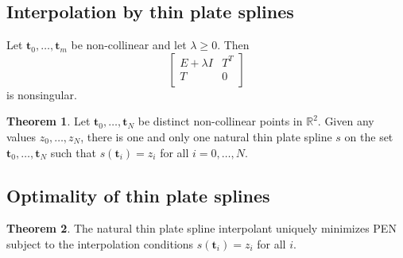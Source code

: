 \documentclass[12pt, openany]{report}
\newcommand{\R}{\mathbb{R}}
\theoremstyle{definition}
\newtheorem{thm}{Theorem}[chapter]
\begin{document}
\subsection{Interpolation by thin plate splines}
Let $\textbf{t}_0,\dots,\textbf{t}_m$ be non-collinear and let $\lambda \ge 0$. Then 
\begin{equation}
    \begin{bmatrix}
        E+\lambda I& T^T\\
        T & 0\\
    \end{bmatrix}
\end{equation}
is nonsingular. 
\begin{thm}
    Let $\textbf{t}_0,\dots,\textbf{t}_N$ be distinct non-collinear points in $\R^2$. Given any values $z_0,\dots, z_N$, there is one and only one natural thin plate spline $s$ on the set $\textbf{t}_0,\dots,\textbf{t}_N$ such that $s(\textbf{t}_i)=z_i$ for all $i=0,\dots,N$.
\end{thm}
\subsection{Optimality of thin plate splines}
\begin{thm}
    The natural thin plate spline interpolant uniquely minimizes PEN subject to the interpolation conditions $s(\textbf{t}_i)=z_i$ for all $i$. 
\end{thm}
\end{document}
